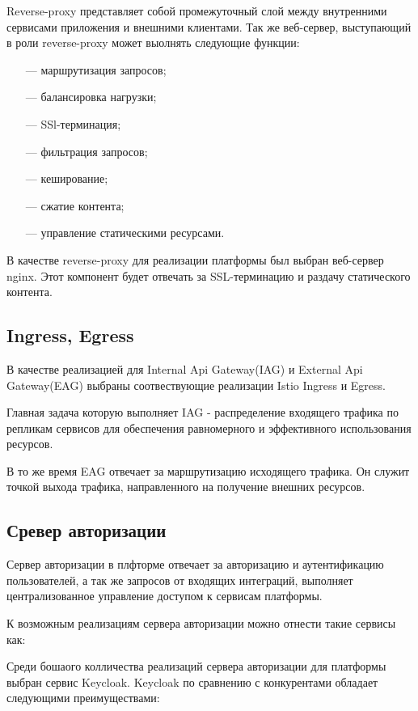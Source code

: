 Reverse-proxy представляет собой промежуточный слой между внутренними сервисами приложения и внешними клиентами.
Так же веб-сервер, выступающий в роли reverse-proxy может выолнять следующие функции:

\begin{itemize}
  \item[---] маршрутизация запросов; 
  \item[---] балансировка нагрузки;
  \item[---] SSl-терминация;
  \item[---] фильтрация запросов;
  \item[---] кеширование;
  \item[---] сжатие контента;
  \item[---] управление статическими ресурсами. 
\end{itemize}

В качестве reverse-proxy для реализации платформы был выбран веб-сервер nginx. Этот компонент будет отвечать за SSL-терминацию и раздачу статического контента.

\subsection{Ingress, Egress}

В качестве реализацией для Internal Api Gateway(IAG) и External Api Gateway(EAG) выбраны соотвествующие реализации Istio Ingress и Egress.

Главная задача которую выполняет IAG - распределение входящего трафика по репликам сервисов для обеспечения равномерного и эффективного использования ресурсов.

В то же время EAG отвечает за маршрутизацию исходящего трафика. Он служит точкой выхода трафика, направленного на получение внешних ресурсов.

\subsection{Сревер авторизации}

Сервер авторизации в плфторме отвечает за авторизацию и аутентификацию пользователей, а так же запросов от входящих интеграций, выполняет централизованное управление доступом к сервисам платформы. 

К возможным реализациям сервера авторизации можно отнести такие сервисы как:

Среди бошаого колличества реализаций сервера авторизации для платформы выбран сервис Keycloak. Keycloak по сравнению с конкурентами обладает следующими преимуществами:

